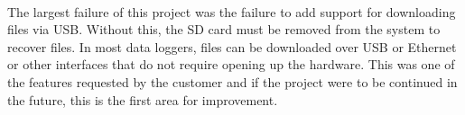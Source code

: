 \paragraph{}
The largest failure of this project was the failure to add support for downloading files via USB.
Without this, the SD card must be removed from the system to recover files.
In most data loggers, files can be downloaded over USB or Ethernet or other interfaces that do not require opening up the hardware.
This was one of the features requested by the customer and if the project were to be continued in the future, this is the first area for improvement.